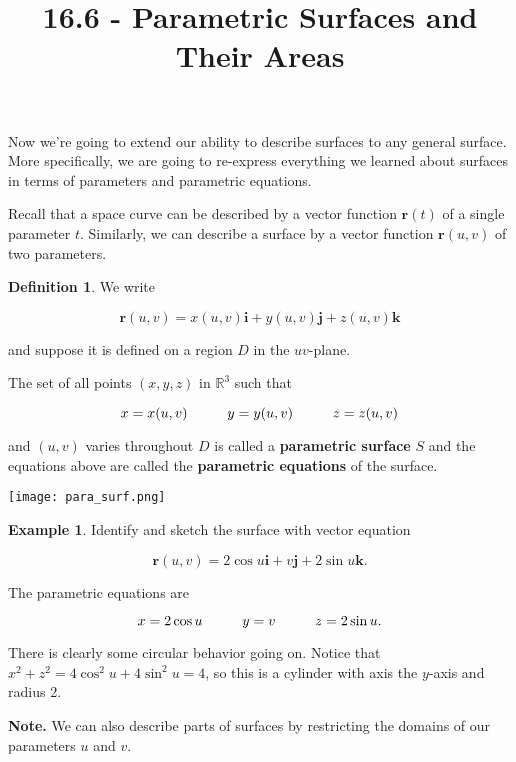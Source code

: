 \documentclass[11pt,oneside,english]{amsart}
\theoremstyle{definition}
\newtheorem*{example}{Example}
\newtheorem*{definition}{Definition}
\newcommand{\pspace}{\hspace{10mm}}
\newcommand{\R}{\mathbb{R}}
\begin{document}
\vspace*{-1cm}
\title{16.6 - Parametric Surfaces and Their Areas}
\maketitle


Now we're going to extend our ability to describe surfaces to any general surface. More specifically, we are going to re-express everything we learned about surfaces in terms of parameters and parametric equations.

Recall that a space curve can be described by a vector function $\mathbf{r}(t)$ of a single parameter $t$. Similarly, we can describe a surface by a vector function $\mathbf{r}(u,v)$ of two parameters. 

\begin{definition}
We write

\[
\mathbf{r}(u,v)=x(u,v)\mathbf{i}+y(u,v)\mathbf{j}+z(u,v)\mathbf{k}
\]

and suppose it is defined on a region $D$ in the $uv$-plane. 

The set of all points $(x,y,z)$ in $\R^3$ such that

\[
x=x(u,v)\pspace y=y(u,v)\pspace z=z(u,v)
\]

and $(u,v)$ varies throughout $D$ is called a \textbf{parametric surface} $S$ and the equations above are called the \textbf{parametric equations} of the surface.

\begin{center}
\texttt{[image: para\_surf.png]}
\end{center}
\end{definition}

\begin{example}
Identify and sketch the surface with vector equation 

\[
\mathbf{r}(u,v)=2\cos u\mathbf{i}+v\mathbf{j}+2\sin u\mathbf{k}.
\]

The parametric equations are

\[
x=2\cos u\pspace y=v\pspace z=2\sin u.
\]

There is clearly some circular behavior going on. Notice that $x^2+z^2=4\cos^2 u+4\sin^2 u=4$, so this is a cylinder with axis the $y$-axis and radius 2.
\end{example}

\textbf{Note.} We can also describe parts of surfaces by restricting the domains of our parameters $u$ and $v$.
\end{document}
